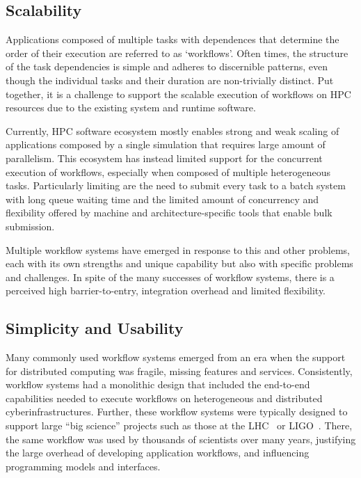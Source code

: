 \documentclass[conference]{IEEEtran}
\begin{document}
\subsection{Scalability}

Applications composed of multiple tasks with dependences that determine the
order of their execution are referred to as `workflows'. Often times, the
structure of the task dependencies is simple and adheres to discernible
patterns, even though the individual tasks and their duration are
non-trivially distinct. Put together, it is a challenge to support the
scalable execution of workflows on HPC resources due to the existing system
and runtime software.

Currently, HPC software ecosystem mostly enables strong and weak scaling of
applications composed by a single simulation that requires large amount of
parallelism. This ecosystem has instead limited support for the concurrent
execution of workflows, especially when composed of multiple heterogeneous
tasks. Particularly limiting are the need to submit every task to a batch
system with long queue waiting time and the limited amount of concurrency and
flexibility offered by machine and architecture-specific tools that enable
bulk submission.

Multiple workflow systems have emerged in response to this and other
problems, each with its own strengths and unique capability but also with
specific problems and challenges. In spite of the many successes of workflow
systems, there is a perceived high barrier-to-entry, integration overhead and
limited flexibility.

\subsection{Simplicity and Usability}

Many commonly used workflow systems emerged from an era when the support for
distributed computing was fragile, missing features and services.
Consistently, workflow systems had a monolithic design that included the
end-to-end capabilities needed to execute workflows on heterogeneous and
distributed cyberinfrastructures. Further, these workflow systems were
typically designed to support large ``big science'' projects such as those at
the LHC~\cite{breskin2009cern} or LIGO~\cite{althouse1992ligo}. There, the
same workflow was used by thousands of scientists over many years, justifying
the large overhead of developing application workflows, and influencing
programming models and interfaces.
\end{document}
